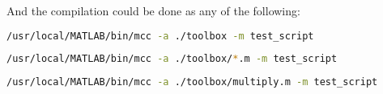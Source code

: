 And the compilation could be done as any of the following:

\begin{lstlisting}[language=bash]
/usr/local/MATLAB/bin/mcc -a ./toolbox -m test_script
\end{lstlisting}

\begin{lstlisting}[language=bash]
/usr/local/MATLAB/bin/mcc -a ./toolbox/*.m -m test_script
\end{lstlisting}

\begin{lstlisting}[language=bash]
/usr/local/MATLAB/bin/mcc -a ./toolbox/multiply.m -m test_script
\end{lstlisting}

